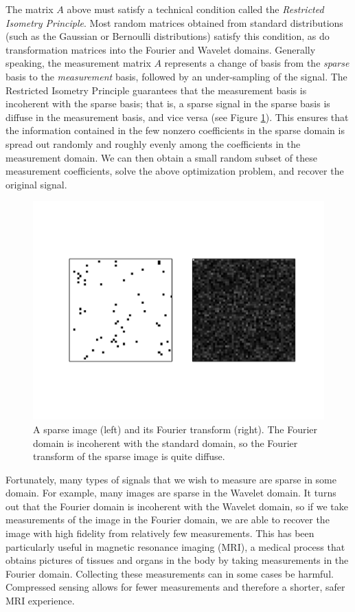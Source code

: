 The matrix $A$ above must satisfy a technical condition called the \emph{Restricted Isometry Principle}. Most
random matrices obtained from standard distributions (such as the Gaussian or Bernoulli distributions) satisfy this
condition, as do transformation matrices into the Fourier and Wavelet domains. Generally speaking,
the measurement matrix $A$ represents a change of basis from the \emph{sparse} basis to the \emph{measurement} basis,
followed by an under-sampling of the signal. The Restricted Isometry Principle guarantees that the measurement
basis is incoherent with the sparse basis; that is, a sparse signal in the sparse basis is diffuse in the measurement
basis, and vice versa (see Figure \ref{fig:incoherent}). This ensures that the information contained in the few nonzero
coefficients in the sparse
domain is spread out randomly and roughly evenly among the coefficients in the measurement domain.
We can then obtain a small random subset of these measurement coefficients, solve the above optimization problem,
and recover the original signal.

\begin{figure}
\centering
\includegraphics[width=\textwidth]{incoherent.pdf}
\caption{A sparse image (left) and its Fourier transform (right). The Fourier domain is incoherent with the
standard domain, so the Fourier transform of the sparse image is quite diffuse.}
\label{fig:incoherent}
\end{figure}

Fortunately, many types of signals that we wish to measure are sparse in some domain. For example, many images
are sparse in the Wavelet domain. It turns out that the Fourier domain is incoherent with the Wavelet domain,
so if we take measurements of the image in the Fourier domain, we are able to recover the image with high
fidelity from relatively few measurements. This has been particularly useful in magnetic resonance imaging
(MRI), a medical process that obtains pictures of tissues and organs in the body by taking measurements in
the Fourier domain. Collecting these measurements can in some cases be harmful. Compressed sensing
allows for fewer measurements and therefore a shorter, safer MRI experience.

